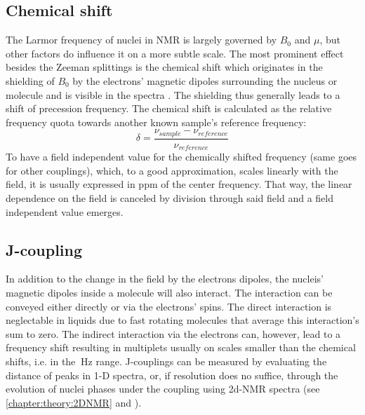         \subsection{Chemical shift}
            The Larmor frequency of nuclei in NMR is largely governed by $B_0$ and $\mu$, but other factors do influence it on a more subtle scale. The most prominent effect besides the Zeeman splittings is the chemical shift which originates in the shielding of $B_0$ by the electrons' magnetic dipoles surrounding the nucleus or molecule and is visible in the spectra \cite{gottlieb_nmr_1997}. The shielding thus generally leads to a shift of precession frequency. The chemical shift is calculated as the relative frequency quota towards another known sample's reference frequency:
            \begin{equation}
                \delta = \frac{\nu_{sample} - \nu_{reference}}{\nu_{reference}}
            \end{equation}
            To have a field independent value for the chemically shifted frequency (same goes for other couplings), which, to a good approximation, scales linearly with the field, it is usually expressed in ppm of the center frequency. That way, the linear dependence on the field is canceled by division through said field and a field independent value emerges.
        \subsection{J-coupling}
        In addition to the change in the field by the electrons dipoles, the nucleis' magnetic dipoles inside a molecule will also interact. The interaction can be conveyed either directly or via the electrons' spins. The direct interaction is neglectable in liquids due to fast rotating molecules that average this interaction's sum to zero. The indirect interaction via the electrons can, however, lead to a frequency shift resulting in multiplets usually on scales smaller than the chemical shifts, i.e. in the $\SI{}{\hertz}$ range.
        J-couplings can be measured by evaluating the distance of peaks in 1-D spectra, or, if resolution does no suffice, through the evolution of nuclei phases under the coupling using 2d-NMR spectra (see \ref{chapter:theory:2DNMR} and \cite{ottiger_measurement_1998}).
